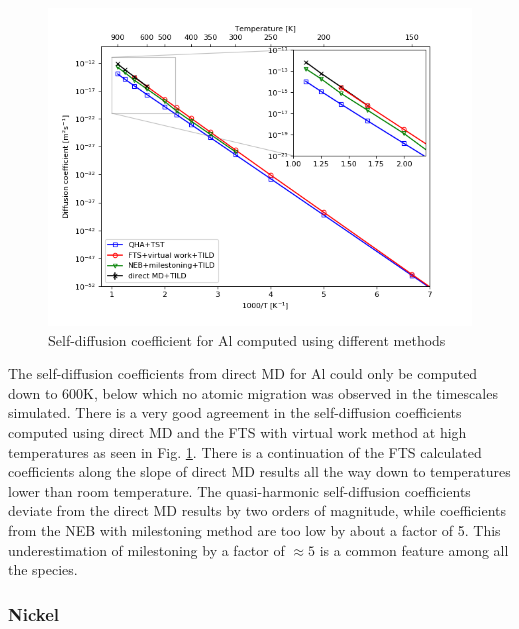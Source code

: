 \documentclass{article}
\begin{document}
\begin{figure}[htp]
\centering
\includegraphics[scale=0.65]{al_self_diffusion}
\caption{Self-diffusion coefficient for Al computed using different methods}
\label{fig:10}
\end{figure}

The self-diffusion coefficients from direct MD for Al could only be computed down to 600K, below which no atomic migration was observed in the timescales simulated. There is a very good agreement in the self-diffusion coefficients computed using direct MD and the FTS with virtual work method at high temperatures as seen in Fig. \ref{fig:10}. There is a continuation of the FTS calculated coefficients along the slope of direct MD results all the way down to temperatures lower than room temperature. The quasi-harmonic self-diffusion coefficients deviate from the direct MD results by two orders of magnitude, while coefficients from the NEB with milestoning method are too low by about a factor of 5. This underestimation of milestoning by a factor of $\approx 5$ is a common feature among all the species.

\subsubsection{Nickel}
\end{document}
